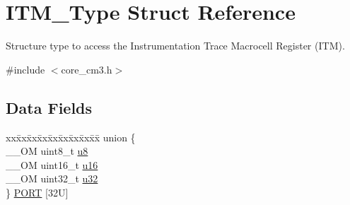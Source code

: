 \hypertarget{struct_i_t_m___type}{}\section{I\+T\+M\+\_\+\+Type Struct Reference}
\label{struct_i_t_m___type}


Structure type to access the Instrumentation Trace Macrocell Register (I\+TM).  




{\ttfamily \#include $<$core\+\_\+cm3.\+h$>$}

\subsection*{Data Fields}
\begin{DoxyCompactItemize}
\item 
\begin{tabbing}
xx\=xx\=xx\=xx\=xx\=xx\=xx\=xx\=xx\=\kill
union \{\\
\>\_\_OM uint8\_t \mbox{\hyperlink{struct_i_t_m___type_a4c0550e859d614c607bd4b575f05425c}{u8}}\\
\>\_\_OM uint16\_t \mbox{\hyperlink{struct_i_t_m___type_ae93660eefe2482a8564fae9a1ca39739}{u16}}\\
\>\_\_OM uint32\_t \mbox{\hyperlink{struct_i_t_m___type_ae89dd50f788f12863c681fba1a5b60d1}{u32}}\\
\} \mbox{\hyperlink{struct_i_t_m___type_a5d8a5967362b507fd70e4c31ce7c5c3f}{PORT}} \mbox{[}32U\mbox{]}\\


\end{tabbing}
\end{DoxyCompactItemize}
